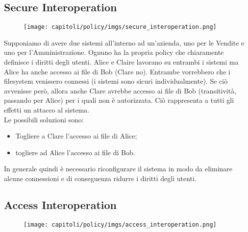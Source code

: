 \subsection{Secure Interoperation}

\begin{figure}[H]
    \centering
    \texttt{[image: capitoli/policy/imgs/secure\_interoperation.png]}
\end{figure}

Supponiamo di avere due sistemi all'interno ad un'azienda, uno per le Vendite e uno per l'Amministrazione. Ognuno ha la propria policy che chiaramente definisce i diritti degli utenti. Alice e Claire lavorano su entrambi i sistemi ma Alice ha anche accesso ai file di Bob (Clare no). Entrambe vorrebbero che i filesystem venissero connessi (i sistemi sono sicuri individualmente). Se ciò avvenisse però, allora anche Clare avrebbe accesso ai file di Bob (transitività, passando per Alice) per i quali non è autorizzata. Ciò rappresenta a tutti gli effetti un attacco al sistema.\\

Le possibili soluzioni sono:

\begin{itemize}
    \item Togliere a Clare l'accesso ai file di Alice;
    \item togliere ad Alice l'accesso ai file di Bob.
\end{itemize}

In generale quindi è necessario riconfigurare il sistema in modo da eliminare alcune connessioni e di conseguenza ridurre i diritti degli utenti.

\subsection{Access Interoperation}

\begin{figure}[H]
    \centering
    \texttt{[image: capitoli/policy/imgs/access\_interoperation.png]}
\end{figure}

